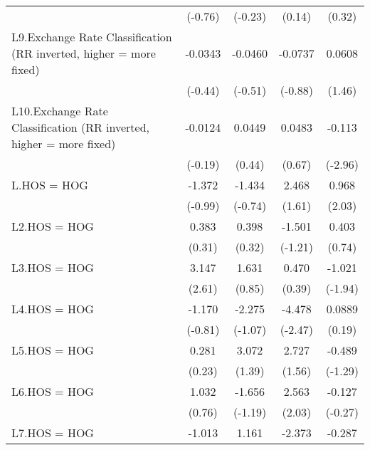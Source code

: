 {\begin{longtable}{l*{4}{c}}
                &  (-0.76)         &  (-0.23)         &   (0.14)         &   (0.32)         \\
\addlinespace
L9.Exchange Rate Classification (RR inverted, higher = more fixed)&  -0.0343         &  -0.0460         &  -0.0737         &   0.0608         \\
                &  (-0.44)         &  (-0.51)         &  (-0.88)         &   (1.46)         \\
\addlinespace
L10.Exchange Rate Classification (RR inverted, higher = more fixed)&  -0.0124         &   0.0449         &   0.0483         &   -0.113\sym{**} \\
                &  (-0.19)         &   (0.44)         &   (0.67)         &  (-2.96)         \\
\addlinespace
L.HOS = HOG     &   -1.372         &   -1.434         &    2.468         &    0.968\sym{*}  \\
                &  (-0.99)         &  (-0.74)         &   (1.61)         &   (2.03)         \\
\addlinespace
L2.HOS = HOG    &    0.383         &    0.398         &   -1.501         &    0.403         \\
                &   (0.31)         &   (0.32)         &  (-1.21)         &   (0.74)         \\
\addlinespace
L3.HOS = HOG    &    3.147\sym{**} &    1.631         &    0.470         &   -1.021         \\
                &   (2.61)         &   (0.85)         &   (0.39)         &  (-1.94)         \\
\addlinespace
L4.HOS = HOG    &   -1.170         &   -2.275         &   -4.478\sym{*}  &   0.0889         \\
                &  (-0.81)         &  (-1.07)         &  (-2.47)         &   (0.19)         \\
\addlinespace
L5.HOS = HOG    &    0.281         &    3.072         &    2.727         &   -0.489         \\
                &   (0.23)         &   (1.39)         &   (1.56)         &  (-1.29)         \\
\addlinespace
L6.HOS = HOG    &    1.032         &   -1.656         &    2.563\sym{*}  &   -0.127         \\
                &   (0.76)         &  (-1.19)         &   (2.03)         &  (-0.27)         \\
\addlinespace
L7.HOS = HOG    &   -1.013         &    1.161         &   -2.373         &   -0.287         \\

\end{longtable}}
